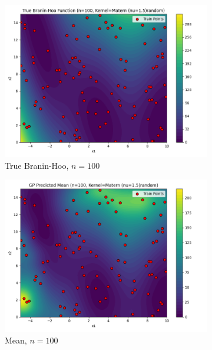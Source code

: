 \documentclass[a4paper,12pt]{article}
\begin{document}
\begin{figure}[H]
\begin{subfigure}{0.3\textwidth}
  \includegraphics[width=\linewidth]{Task-02/images/true_function_matern_n100_random.png}
  \caption{True Branin-Hoo, $n=100$}
\end{subfigure}
\begin{subfigure}{0.3\textwidth}
    \includegraphics[width=\linewidth]{Task-02/images/gp_mean_matern_n100_random.png}
    \caption{Mean, $n=100$}
\end{subfigure}
\begin{subfigure}{0.3\textwidth}

\end{subfigure}
\end{figure}
\end{document}
